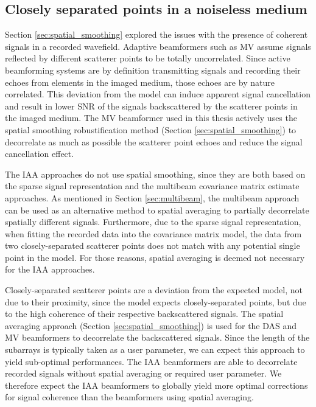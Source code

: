 \clearpage
\subsection{Closely separated points in a noiseless medium}
\label{sec:twopoints_noiseless}
Section \ref{sec:spatial_smoothing} explored the issues with the presence of coherent signals in a recorded wavefield. Adaptive beamformers such as MV assume signals reflected by different scatterer points to be totally uncorrelated. Since active beamforming systems are by definition transmitting signals and recording their echoes from elements in the imaged medium, those echoes are by nature correlated.
This deviation from the model can induce apparent signal cancellation and result in lower SNR of the signals backscattered by the scatterer points in the imaged medium. The MV beamformer used in this thesis actively uses the spatial smoothing robustification method (Section \ref{sec:spatial_smoothing}) to decorrelate as much as possible the scatterer point echoes and reduce the signal cancellation effect.

The IAA approaches do not use spatial smoothing, since they are both based on the sparse signal representation and the multibeam covariance matrix estimate approaches.
As mentioned in Section \ref{sec:multibeam}, the multibeam approach can be used as an alternative method to spatial averaging to partially decorrelate spatially different signals.
Furthermore, due to the sparse signal representation, when fitting the recorded data into the covariance matrix model, the data from two closely-separated scatterer points does not match with any potential single point in the model.
For those reasons, spatial averaging is deemed not necessary for the IAA approaches.

Closely-separated scatterer points are a deviation from the expected model, not due to their proximity, since the model expects closely-separated points, but due to the high coherence of their respective backscattered signals.
The spatial averaging approach (Section \ref{sec:spatial_smoothing}) is used for the DAS and MV beamformers to decorrelate the backscattered signals. Since the length of the subarrays is typically taken as a user parameter, we can expect this approach to yield sub-optimal performances.
The IAA beamformers are able to decorrelate recorded signals without spatial averaging or required user parameter.
We therefore expect the IAA beamformers to globally yield more optimal corrections for signal coherence than the beamformers using spatial averaging.

